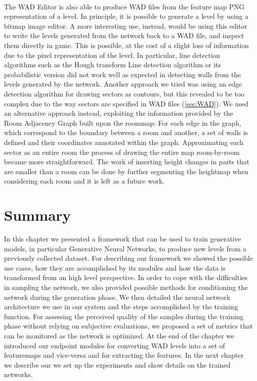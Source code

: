 \paragraph{} The WAD Editor is also able to produce WAD files from the feature map PNG representation of a level. In principle, it is possible to generate a level by  using a bitmap image editor. A more interesting use, instead, would be using this editor to write the levels generated from the network back to a WAD file, and inspect them directly in game. This is possible, at the cost of a slight loss of information due to the pixel representation of the level. In particular, line detection algorithms such as the Hough transform Line detection algorithm \cite{hough} or its probabilistic version \cite{houghprob} did not work well as expected in detecting walls from the levels generated by the network. Another approach we tried was using an edge detection algorithm for drawing sectors as contours, but this revealed to be too complex due to the way sectors are specified in WAD files (\ref{sec:WAD}). We used an alternative approach instead, exploiting the information provided by the Room Adjacency Graph built upon the \gls{roommap}: For each edge in the graph, which correspond to the boundary between a room and another, a set of walls is defined and their coordinates annotated within the graph. Approximating each sector as an entire room the process of drawing the entire map room-by-room became more straightforward. The work of inserting height changes in parts that are smaller than a room can be done by further segmenting the heightmap when considering each room and it is left as a future work.

\section{Summary} 
In this chapter we presented a framework that can be used to train generative models, in particular Generative Neural Networks, to produce new levels from a previously collected dataset. For describing our framework we showed the possible use cases, how they are accomplished by its modules and how the data is transformed from an high level perspective. In order to cope with the difficulties in sampling the network, we also provided possible methods for conditioning the network during the generation phase. We then detailed the neural network architecture we use in our system and the steps accomplished by the training function. For assessing the perceived quality of the samples during the training phase without relying on subjective evaluations, we proposed a set of metrics that can be monitored as the network is optimized. At the end of the chapter we introduced our endpoint modules for converting WAD levels into a set of \glspl{featuremap} and vice-versa and for extracting the features. In the next chapter we describe our we set up the experiments and show details on the trained networks.